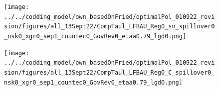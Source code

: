 \begin{figure}[h!!]
\begin{minipage}[]{0.32\textwidth}
	\end{minipage}	
	\begin{minipage}[]{0.32\textwidth}
		\texttt{[image: ../../codding\_model/own\_basedOnFried/optimalPol\_010922\_revision/figures/all\_13Sept22/CompTaul\_LFBAU\_Reg0\_sn\_spillover0\_nsk0\_xgr0\_sep1\_countec0\_GovRev0\_etaa0.79\_lgd0.png]}
	\end{minipage}		
	\begin{minipage}[]{0.32\textwidth}
		\texttt{[image: ../../codding\_model/own\_basedOnFried/optimalPol\_010922\_revision/figures/all\_13Sept22/CompTaul\_LFBAU\_Reg0\_C\_spillover0\_nsk0\_xgr0\_sep1\_countec0\_GovRev0\_etaa0.79\_lgd0.png]}
	\end{minipage}	
\end{figure}

